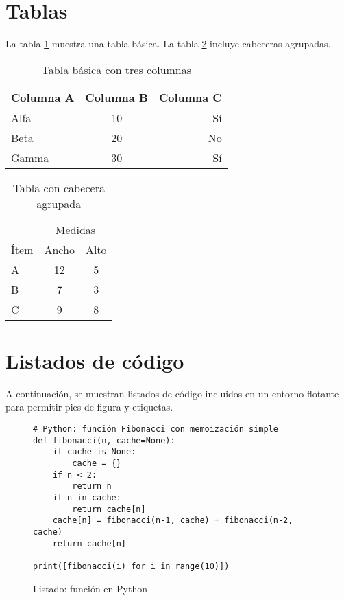 \section{Tablas}
La tabla \ref{tab:basica} muestra una tabla básica. La tabla \ref{tab:agrupada} incluye cabeceras agrupadas.

\begin{table}[htbp]
  \centering
  \caption{Tabla básica con tres columnas}
  \label{tab:basica}
  \begin{tabular}{lcr}
    \hline
    Columna A & Columna B & Columna C \\
    \hline
    Alfa  & 10 & Sí \\
    Beta  & 20 & No \\
    Gamma & 30 & Sí \\
    \hline
  \end{tabular}
\end{table}

\begin{table}[htbp]
  \centering
  \caption{Tabla con cabecera agrupada}
  \label{tab:agrupada}
  \begin{tabular}{lcc}
    \hline
    & \multicolumn{2}{c}{Medidas} \\
    \cline{2-3}
    Ítem   & Ancho & Alto \\
    \hline
    A      & 12    & 5 \\
    B      & 7     & 3 \\
    C      & 9     & 8 \\
    \hline
  \end{tabular}
\end{table}

\section{Listados de código}
A continuación, se muestran listados de código incluidos en un entorno flotante para permitir pies de figura y etiquetas.

\begin{figure}[htbp]
  \centering
  \begin{minipage}{0.95\linewidth}
\begin{verbatim}
# Python: función Fibonacci con memoización simple
def fibonacci(n, cache=None):
    if cache is None:
        cache = {}
    if n < 2:
        return n
    if n in cache:
        return cache[n]
    cache[n] = fibonacci(n-1, cache) + fibonacci(n-2, cache)
    return cache[n]

print([fibonacci(i) for i in range(10)])
\end{verbatim}
  \end{minipage}
  \caption{Listado: función en Python}
  \label{lst:python}
\end{figure}

